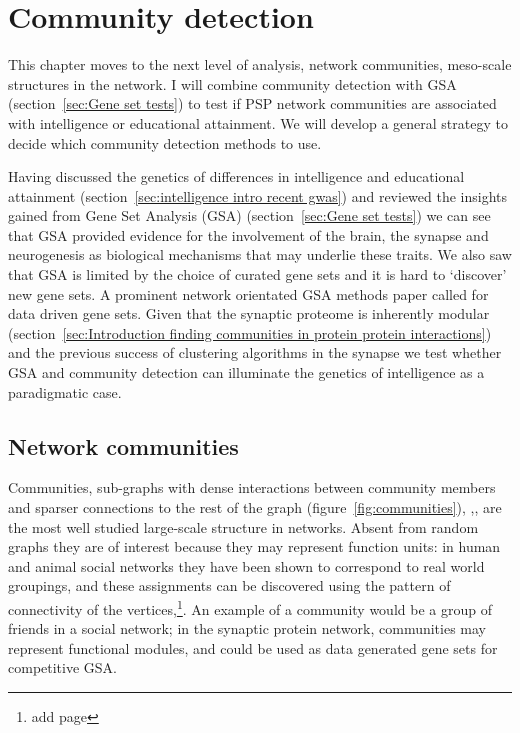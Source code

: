 
\chapter{Community detection}
\label{chap:community detection}

This chapter moves to the next level of analysis, network communities, meso-scale structures in the network. I will combine community detection with GSA (section~\ref{sec:Gene set tests}) to test if  PSP network communities are associated with intelligence or educational attainment. We will develop a general strategy to decide which community detection methods to use. 

Having discussed the genetics of differences in intelligence and educational attainment (section~\ref{sec:intelligence intro recent gwas}) and reviewed the insights gained from Gene Set Analysis (GSA) (section~\ref{sec:Gene set tests}) we can see that GSA provided evidence for the involvement of the brain, the synapse and neurogenesis as biological mechanisms that may underlie these traits. We also saw that GSA is limited by the choice of curated gene sets and it is hard to `discover' new gene sets. A prominent network orientated GSA methods paper called for data driven gene sets\cite{lamparter2016fast}. Given that the synaptic proteome is inherently modular (section~\ref{sec:Introduction finding communities in protein protein interactions}) and the previous success of clustering algorithms in the synapse we test whether GSA and community detection can illuminate the genetics of intelligence as a paradigmatic case. 





\section{Network communities}
\label{sec: community detection intro gsa}


Communities, sub-graphs with dense interactions between community members and sparser connections to the rest of the graph (figure~\ref{fig:communities}), \cite{newman2012communities},\cite{fortunato2016community},\cite{girvan2002community} are the most well studied large-scale structure in networks\cite{newman2012communities}.  Absent from random graphs they are of interest because they may represent function units: in human and animal social networks they have been shown to correspond to real world groupings, and these assignments can be discovered using the pattern of connectivity of the vertices\cite{adamic2005political},\cite{zachary1977information}\cite{newman2018networks}\footnote{add page}.  An example of a community would be a group of friends in a social network; in the synaptic protein network, communities may represent functional modules\cite{pocklington2006proteomes},\cite{mclean2016improved} and could be used as data generated gene sets for competitive GSA.  


